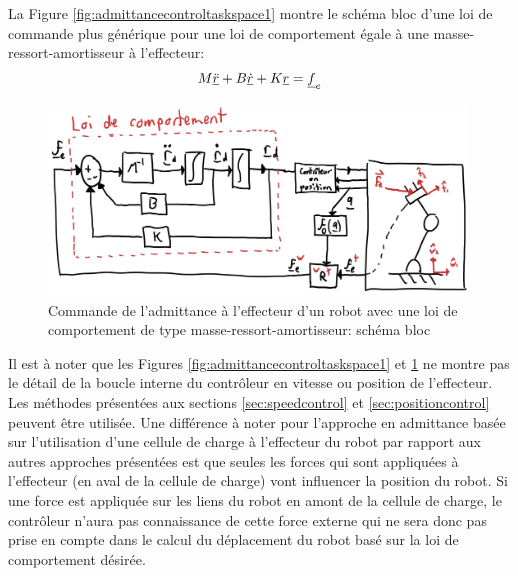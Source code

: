 La Figure \ref{fig:admittancecontroltaskspace1} montre le schéma bloc d'une loi de commande plus générique pour une loi de comportement égale à une masse-ressort-amortisseur à l'effecteur:
\begin{align}
	M \underline{\ddot{r}} + B \underline{\dot{r}} + K \underline{r}= \underline{f}_e
\end{align}
\begin{figure}[h]
	\centering
	\includegraphics[width=0.99\textwidth]{fig/admittancecontroltaskspace.jpg}
	\caption{Commande de l'admittance à l'effecteur d'un robot avec une loi de comportement de type masse-ressort-amortisseur: schéma bloc}
	\label{fig:admittancecontroltaskspace}
\end{figure}
Il est à noter que les Figures \ref{fig:admittancecontroltaskspace1} et \ref{fig:admittancecontroltaskspace} ne montre pas le détail de la boucle interne du contrôleur en vitesse ou position de l'effecteur. Les méthodes présentées aux sections \ref{sec:speedcontrol} et \ref{sec:positioncontrol} peuvent être utilisée. Une différence à noter pour l'approche en admittance basée sur l'utilisation d'une cellule de charge à l'effecteur du robot par rapport aux autres approches présentées est que seules les forces qui sont appliquées à l'effecteur (en aval de la cellule de charge) vont influencer la position du robot. Si une force est appliquée sur les liens du robot en amont de la cellule de charge, le contrôleur n'aura pas connaissance de cette force externe qui ne sera donc pas prise en compte dans le calcul du déplacement du robot basé sur la loi de comportement désirée.

